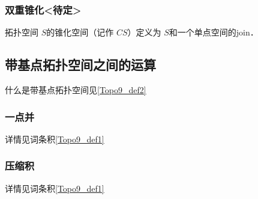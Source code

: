 
\subsubsection{双重锥化<待定>}

\begin{definition}{}
拓扑空间 $S$的锥化空间（记作 $C S$）定义为 $S$和一个单点空间的join．
\end{definition}


\subsection{带基点拓扑空间之间的运算}

什么是带基点拓扑空间见\autoref{Topo9_def2}~

\subsubsection{一点并}

详情见词条积\autoref{Topo9_def1}~


\subsubsection{压缩积}

详情见词条积\autoref{Topo9_def1}~




